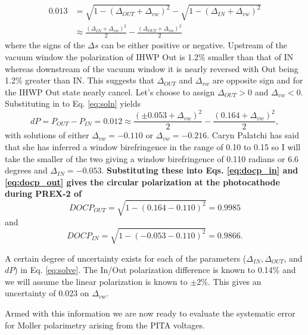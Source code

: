 \documentclass[12pt]{article}
\begin{document}
\begin{equation}
\label{eq:soln}
\begin{split}
0.013&=\sqrt{1-(\Delta_{OUT}+\Delta_{vw})^2}-\sqrt{1-(\Delta_{IN}+\Delta_{vw})^2}\\
~&\approx\frac{\left(\Delta_{IN}+\Delta_{vw}\right)^2}{2}-\frac{\left(\Delta_{OUT}+\Delta_{vw}\right)^2}{2}
\end{split}
\end{equation}
where the signs of the $\Delta s$ can be either positive or negative. Upstream of the vacuum window the polarization of IHWP Out is 1.2\% smaller than that of IN whereas downstream of the vacuum window it is nearly reversed with Out being 1.2\% greater than IN.  This suggests that $\Delta_{OUT}$ and $\Delta_{vw}$ are opposite sign and for the IHWP Out state nearly cancel.  Let's choose to assign $\Delta_{OUT}>0$ and $\Delta_{vw}<0$. Substituting in to Eq. \ref{eq:soln} yields
\begin{equation}
\label{eq:solve}
dP=P_{OUT}-P_{IN}=0.012 \approx \frac{\left(\pm0.053+\Delta_{vw}\right)^2}{2}-\frac{\left(0.164+\Delta_{vw}\right)^2}{2},
\end{equation}
with solutions of either $\Delta_{vw}=-0.110$ or $\Delta_{vw}=-0.216$. Caryn Palatchi has said that she has inferred a window birefringence in the range of 0.10 to 0.15 so I will take the smaller of the two giving a window birefringence of 0.110 radians or 6.6 degrees and $\Delta_{IN}=-0.053$.  \textbf{Substituting these into Eqs. \ref{eq:docp_in} and \ref{eq:docp_out}  gives the circular polarization at the photocathode during PREX-2 of }
\[DOCP_{OUT}=\sqrt{1-(0.164-0.110)^2}=0.9985
\]
 and 
 \[DOCP_{IN}=\sqrt{1-(-0.053-0.110)^2}=0.9866.
 \]

A certain degree of uncertainty exists for each of the parameters ($\Delta_{IN}, \Delta_{OUT}$, and $dP$) in Eq. \ref{eq:solve}. The In/Out polarization difference is known to 0.14\% and we will assume the linear polarization is known to $\pm$2\%. This gives an uncertainty of 0.023 on $\Delta_{vw}$.

Armed with this information we are now ready to evaluate the systematic error for Moller polarimetry arising from the PITA voltages.
\end{document}
